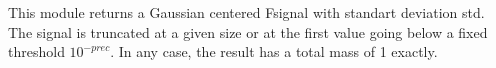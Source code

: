 This module returns a Gaussian centered Fsignal
with standart deviation std. The signal is truncated
at a given size or at the first value going below
a fixed threshold $10^{-prec}$. In any case, the result  
has a total mass of 1 exactly.

